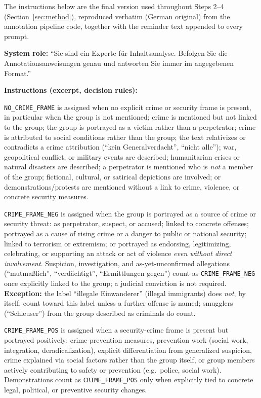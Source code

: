 \documentclass[a4paper,oneside,bibliography=totoc]{scrartcl}
\begin{document}
The instructions below are the final version used throughout Steps 2--4 (Section~\ref{sec:method}), reproduced verbatim (German original) from the annotation pipeline code, together with the reminder text appended to every prompt.

\begin{instructionbox}
\textbf{System role:} \enquote{Sie sind ein Experte f\"ur Inhaltsanalyse. Befolgen Sie die Annotationsanweisungen genau und antworten Sie immer im angegebenen Format.}

\medskip
\textbf{Instructions (excerpt, decision rules):}

\texttt{NO\_CRIME\_FRAME} is assigned when no explicit crime or security frame is present, in particular when the group is not mentioned; crime is mentioned but not linked to the group; the group is portrayed as a victim rather than a perpetrator; crime is attributed to social conditions rather than the group; the text relativizes or contradicts a crime attribution (\enquote{kein Generalverdacht}, \enquote{nicht alle}); war, geopolitical conflict, or military events are described; humanitarian crises or natural disasters are described; a perpetrator is mentioned who is \emph{not} a member of the group; fictional, cultural, or satirical depictions are involved; or demonstrations/protests are mentioned without a link to crime, violence, or concrete security measures.

\texttt{CRIME\_FRAME\_NEG} is assigned when the group is portrayed as a source of crime or security threat: as perpetrator, suspect, or accused; linked to concrete offenses; portrayed as a cause of rising crime or a danger to public or national security; linked to terrorism or extremism; or portrayed as endorsing, legitimizing, celebrating, or supporting an attack or act of violence \emph{even without direct involvement}. Suspicion, investigation, and as-yet-unconfirmed allegations (\enquote{mutmaßlich}, \enquote{verdächtigt}, \enquote{Ermittlungen gegen}) count as \texttt{CRIME\_FRAME\_NEG} once explicitly linked to the group; a judicial conviction is not required. \textbf{Exception:} the label \enquote{illegale Einwanderer} (illegal immigrants) does \emph{not}, by itself, count toward this label unless a further offense is named; smugglers (\enquote{Schleuser}) from the group described as criminals do count.

\texttt{CRIME\_FRAME\_POS} is assigned when a security-crime frame is present but portrayed positively: crime-prevention measures, prevention work (social work, integration, deradicalization), explicit differentiation from generalized suspicion, crime explained via social factors rather than the group itself, or group members actively contributing to safety or prevention (e.g.\ police, social work). Demonstrations count as \texttt{CRIME\_FRAME\_POS} only when explicitly tied to concrete legal, political, or preventive security changes.


\end{instructionbox}
\end{document}
